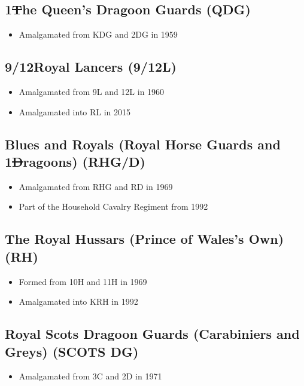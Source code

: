 \subsection*{1\st The Queen's Dragoon Guards (QDG)}

\begin{itemize}
\item Amalgamated from KDG and 2DG in 1959
\end{itemize}

\subsection*{9\th/12\nth Royal Lancers (9/12L)}

\begin{itemize}
\item Amalgamated from 9L and 12L in 1960
\item Amalgamated into RL in 2015
\end{itemize}

\subsection*{Blues and Royals (Royal Horse Guards and 1\st Dragoons) (RHG/D)}

\begin{itemize}
\item Amalgamated from RHG and RD in 1969
\item Part of the Household Cavalry Regiment from 1992
\end{itemize}

\subsection*{The Royal Hussars (Prince of Wales's Own) (RH)}

\begin{itemize}
\item Formed from 10H and 11H in 1969
\item Amalgamated into KRH in 1992
\end{itemize}

\subsection*{Royal Scots Dragoon Guards (Carabiniers and Greys) (SCOTS DG)}

\begin{itemize}
\item Amalgamated from 3C and 2D in 1971
\end{itemize}

